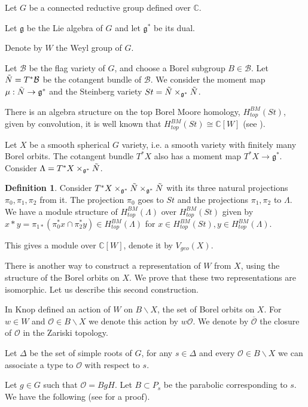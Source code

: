 \documentclass[12pt]{article}
\newcommand{\B}{\mathcal{B}}
\newcommand{\C}{\mathbb{C}}
\newcommand{\s}{\mathcal{O}}
\theoremstyle{plain}
\theoremstyle{definition}
\newtheorem{defn}[theorem]{Definition}
\begin{document}
Let $G$ be a connected reductive group defined over $\C$.

Let $\mathfrak{g}$ be the Lie algebra of $G$ and let $\mathfrak{g}^*$ be its dual.

Denote by $W$ the Weyl group of $G$.

Let $\B$ be the flag variety of $G$, and choose a Borel subgroup $B\in \B$.  Let $\Tilde{N}=T^*\B$ be the cotangent bundle of $\B$. We consider the moment map $\mu:\Tilde{N}\rightarrow \mathfrak{g}^*$ and the Steinberg variety $St=\Tilde{N}\times_{\mathfrak{g}^*}\Tilde{N}$.

There is an algebra structure on the top Borel Moore homology, $H_{top}^{BM}(St)$, given by convolution, it is well known that $H_{top}^{BM}(St)\cong \C[W]$ (see \cite{Chriss1997RepresentationTA}).

Let $X$ be a smooth spherical $G$ variety, i.e. a smooth variety with finitely many Borel orbits. The cotangent bundle $T^*X$ also has a moment map $T^*X\rightarrow \mathfrak{g}^*$. Consider $\Lambda=T^*X\times_{\mathfrak{g}^*}\Tilde{N}$.

\begin{defn}
    Consider $T^*X\times_{\mathfrak{g}^*}\Tilde{N}\times_{\mathfrak{g}^*}\Tilde{N}$ with its three natural projections $\pi_0,\pi_1,\pi_2$ from it. The projection $\pi_0$ goes to $St$ and the projections $\pi_1,\pi_2$ to $\Lambda$. We have a module structure of $H_{top}^{BM}(\Lambda)$ over $H_{top}^{BM}(St)$ given by $x*y=\pi_{1*}(\pi_0^*x\cap \pi_2^*y)\in H_{top}^{BM}(\Lambda)$ for $x\in H_{top}^{BM}(St), y\in H_{top}^{BM}(\Lambda)$. 

    This gives a module over $\C[W]$, denote it by $V_{geo}(X)$.
\end{defn}


There is another way to construct a representation of $W$ from $X$, using the structure of the Borel orbits on $X$. We prove that these two representations are isomorphic. Let us describe this second construction.

In \cite{knop} Knop defined an action of $W$ on $B\backslash X$, the set of Borel orbits on $X$. For $w\in W$ and $\s\in B\backslash X$ we denote this action by $w\s$. We denote by $\overline{\s}$ the closure of $\s$ in the Zariski topology.

Let $\Delta$ be the set of simple roots of $G$, for any $s\in\Delta$ and every $\s\in B\backslash X$ we can associate a type to $\s$ with respect to $s$. 

Let $g\in G$ such that $\s=BgH$. Let $B\subset P_s$ be the parabolic corresponding to $s$. We have the following (see \cite{knop} for a proof). 
\end{document}
